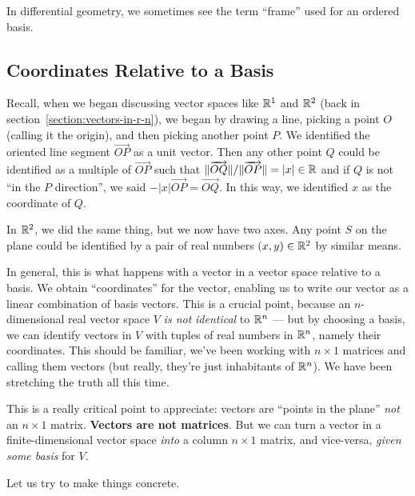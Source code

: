 \begin{remark}
In differential geometry, we sometimes see the term ``frame'' used for
an ordered basis.
\end{remark}

\subsection{Coordinates Relative to a Basis}

\M
Recall, when we began discussing vector spaces like $\mathbb{R}^{1}$ and
$\mathbb{R}^{2}$ (back in section~\ref{section:vectors-in-r-n}), we began by
drawing a line, picking a point $O$ (calling it the origin), and then
picking another point $P$. We identified the oriented line segment
$\overrightarrow{OP}$ as a unit vector. Then any other point $Q$ could
be identified as a multiple of $\overrightarrow{OP}$ such that
$\|\overrightarrow{OQ}\|/\|\overrightarrow{OP}\|=|x|\in\mathbb{R}$ and if $Q$
is not ``in the $P$ direction'', we said
$-|x|\overrightarrow{OP}=\overrightarrow{OQ}$. In this way, we
identified $x$ as the coordinate of $Q$.

\M In $\mathbb{R}^{2}$, we did the same thing, but we now have two axes. Any
point $S$ on the plane could be identified by a pair of real numbers
$(x,y)\in\mathbb{R}^{2}$ by similar means.

\M
In general, this is what happens with a vector in a vector space
relative to a basis. We obtain ``coordinates'' for the vector, enabling
us to write our vector as a linear combination of basis vectors. This is
a crucial point, because an $n$-dimensional real vector space $V$ \emph{is not}
\emph{identical} to $\mathbb{R}^{n}$ --- but by choosing a basis, we can
identify vectors in $V$ with tuples of real numbers in $\mathbb{R}^{n}$, namely
their coordinates. This should be familiar, we've been working with
$n\times1$ matrices and calling them vectors (but really, they're just
inhabitants of $\mathbb{R}^{n}$). We have been stretching the truth all this
time.

\begin{ddanger}
This is a really critical point to appreciate: vectors are ``points in
the plane'' \emph{not} an $n\times 1$ matrix. \textbf{Vectors are not matrices}.
But we can turn a vector in a finite-dimensional vector space
\emph{into} a column $n\times1$ matrix, and vice-versa, \emph{given some basis}
for $V$.
\end{ddanger}

Let us try to make things concrete.

